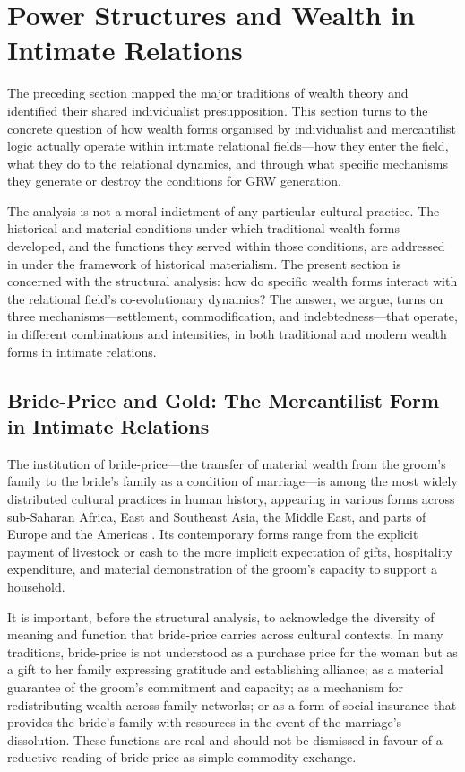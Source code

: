 \section{Power Structures and Wealth in Intimate Relations}
\label{p15:sec:power}

\noindent
The preceding section mapped the major traditions of wealth theory and identified their shared individualist presupposition. This section turns to the concrete question of how wealth forms organised by individualist and mercantilist logic actually operate within intimate relational fields---how they enter the field, what they do to the relational dynamics, and through what specific mechanisms they generate or destroy the conditions for GRW generation.

The analysis is not a moral indictment of any particular cultural practice. The historical and material conditions under which traditional wealth forms developed, and the functions they served within those conditions, are addressed in  under the framework of historical materialism. The present section is concerned with the structural analysis: how do specific wealth forms interact with the relational field's co-evolutionary dynamics? The answer, we argue, turns on three mechanisms---settlement, commodification, and indebtedness---that operate, in different combinations and intensities, in both traditional and modern wealth forms in intimate relations.

\subsection{Bride-Price and Gold: The Mercantilist Form in Intimate Relations}
\label{p15:subsec:brideprice}

\noindent
The institution of bride-price---the transfer of material wealth from the groom's family to the bride's family as a condition of marriage---is among the most widely distributed cultural practices in human history, appearing in various forms across sub-Saharan Africa, East and Southeast Asia, the Middle East, and parts of Europe and the Americas \parencite{mbiti1970}. Its contemporary forms range from the explicit payment of livestock or cash to the more implicit expectation of gifts, hospitality expenditure, and material demonstration of the groom's capacity to support a household.

It is important, before the structural analysis, to acknowledge the diversity of meaning and function that bride-price carries across cultural contexts. In many traditions, bride-price is not understood as a purchase price for the woman but as a gift to her family expressing gratitude and establishing alliance; as a material guarantee of the groom's commitment and capacity; as a mechanism for redistributing wealth across family networks; or as a form of social insurance that provides the bride's family with resources in the event of the marriage's dissolution. These functions are real and should not be dismissed in favour of a reductive reading of bride-price as simple commodity exchange.

